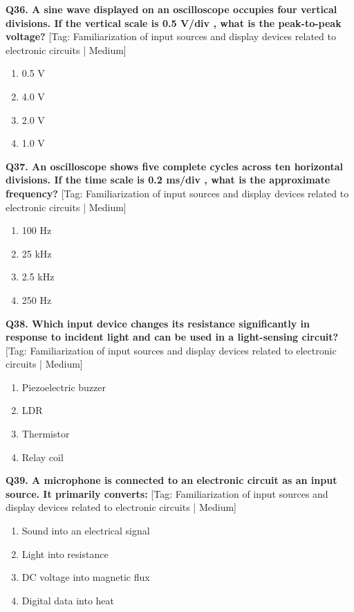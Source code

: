 \noindent\textbf{Q36. A sine wave displayed on an oscilloscope occupies four vertical divisions. If the vertical scale is 0.5 V/div , what is the peak-to-peak voltage?} \hfill [Tag: Familiarization of input sources and display devices related to electronic circuits | Medium]
\begin{enumerate}[label=(\alph*),topsep=2pt,itemsep=1pt,partopsep=0pt,parsep=0pt]
    \item {0.5 V}
    \item {4.0 V}
    \item {2.0 V}
    \item {1.0 V}
\end{enumerate}
\vspace{2mm}

\noindent\textbf{Q37. An oscilloscope shows five complete cycles across ten horizontal divisions. If the time scale is 0.2 ms/div , what is the approximate frequency?} \hfill [Tag: Familiarization of input sources and display devices related to electronic circuits | Medium]
\begin{enumerate}[label=(\alph*),topsep=2pt,itemsep=1pt,partopsep=0pt,parsep=0pt]
    \item {100 Hz}
    \item {25 kHz}
    \item {2.5 kHz}
    \item {250 Hz}
\end{enumerate}
\vspace{2mm}

\noindent\textbf{Q38. Which input device changes its resistance significantly in response to incident light and can be used in a light-sensing circuit?} \hfill [Tag: Familiarization of input sources and display devices related to electronic circuits | Medium]
\begin{enumerate}[label=(\alph*),topsep=2pt,itemsep=1pt,partopsep=0pt,parsep=0pt]
    \item {Piezoelectric buzzer}
    \item {LDR}
    \item {Thermistor}
    \item {Relay coil}
\end{enumerate}
\vspace{2mm}

\noindent\textbf{Q39. A microphone is connected to an electronic circuit as an input source. It primarily converts:} \hfill [Tag: Familiarization of input sources and display devices related to electronic circuits | Medium]
\begin{enumerate}[label=(\alph*),topsep=2pt,itemsep=1pt,partopsep=0pt,parsep=0pt]
    \item {Sound into an electrical signal}
    \item {Light into resistance}
    \item {DC voltage into magnetic flux}
    \item {Digital data into heat}
\end{enumerate}
\vspace{2mm}

